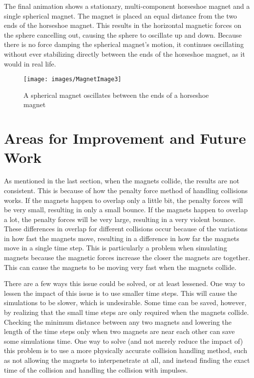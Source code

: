 \documentclass[tog]{acmsiggraph}
\begin{document}
The final animation shows a stationary, multi-component horseshoe magnet and a single spherical magnet. The magnet is placed an equal distance from the two ends of the horseshoe magnet. This results in the horizontal magnetic forces on the sphere cancelling out, causing the sphere to oscillate up and down. Because there is no force damping the spherical magnet's motion, it continues oscillating without ever stabilizing directly between the ends of the horseshoe magnet, as it would in real life.

\begin{figure}[ht]
  \centering
  \texttt{[image: images/MagnetImage3]}
  \caption{A spherical magnet oscillates between the ends of a horseshoe magnet}
\end{figure}

\section{Areas for Improvement and Future Work}

As mentioned in the last section, when the magnets collide, the results are not consistent. This is because of how the penalty force method of handling collisions works. If the magnets happen to overlap only a little bit, the penalty forces will be very small, resulting in only a small bounce. If the magnets happen to overlap a lot, the penalty forces will be very large, resulting in a very violent bounce. These differences in overlap for different collisions occur because of the variations in how fast the magnets move, resulting in a difference in how far the magnets move in a single time step. This is particularly a problem when simulating magnets because the magnetic forces increase the closer the magnets are together. This can cause the magnets to be moving very fast when the magnets collide.

There are a few ways this issue could be solved, or at least lessened. One way to lessen the impact of this issue is to use smaller time steps. This will cause the simulations to be slower, which is undesirable. Some time can be saved, however, by realizing that the small time steps are only required when the magnets collide. Checking the minimum distance between any two magnets and lowering the length of the time steps only when two magnets are near each other can save some simulations time. One way to solve (and not merely reduce the impact of) this problem is to use a more physically accurate collision handling method, such as not allowing the magnets to interpenetrate at all, and instead finding the exact time of the collision and handling the collision with impulses.
\end{document}
